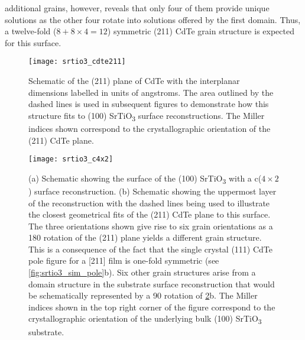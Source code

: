 additional grains, however, reveals that only four of them provide
unique solutions as the other four rotate into solutions offered by
the first domain. Thus, a twelve-fold ($8 + 8 \times 4 = 12$) symmetric
(211) CdTe grain structure is expected for this surface.
\begin{figure}
    \centering
    \texttt{[image: srtio3\_cdte211]}
    \caption[Projection of (211) CdTe unit cell on SrTiO\textsubscript{3} surface]{\label{fig:srtio3_cdte211}Schematic of the (211) plane of CdTe with the interplanar dimensions
        labelled in units of angstroms. The area outlined by the dashed lines is used in
        subsequent figures to demonstrate how this structure fits to (100) SrTiO\textsubscript{3} surface
        reconstructions. The Miller indices shown correspond to the crystallographic
        orientation of the (211) CdTe plane.}
\end{figure}
\begin{figure}
    \centering
    \texttt{[image: srtio3\_c4x2]}
    \caption[CdTe on c(4$\times$2) SrTiO\textsubscript{3} surface]{\label{fig:srtio3_c4x2}(a) Schematic showing the surface of the (100) SrTiO\textsubscript{3} with a c($4\times2$) surface reconstruction. (b) Schematic showing the uppermost layer of the reconstruction with the dashed lines being used to illustrate the closest geometrical fits of the (211) CdTe plane to this surface. The three orientations shown give rise to six grain orientations as a 180\degree{} rotation of the (211) plane yields a different grain structure. This is a consequence of the fact that the single crystal (111) CdTe pole figure for a [211] film is one-fold symmetric (see \cref{fig:srtio3_sim_pole}b). Six other grain structures arise from a domain structure in the substrate surface reconstruction that would be schematically represented by a 90\degree{} rotation of \cref{fig:srtio3_c4x2}b. The Miller indices shown in the top right corner of the figure correspond to the crystallographic orientation of the underlying bulk (100) SrTiO\textsubscript{3} substrate.}
\end{figure}

